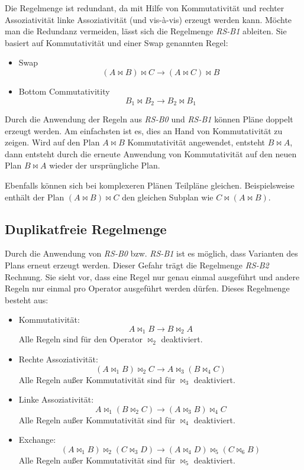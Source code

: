 Die Regelmenge ist redundant, da mit Hilfe von Kommutativität und rechter Assoziativität linke Assoziativität (und vis-à-vis) erzeugt werden kann. Möchte man die Redundanz vermeiden, lässt sich die Regelmenge \textit{RS-B1} ableiten. Sie basiert auf Kommutativität und einer Swap genannten Regel:

\begin{itemize}
\item Swap $$ (A \Join B) \Join C \to (A \Join C) \Join B $$
\item Bottom Commutativitity $$ B_1 \Join B_2 \to B_2 \Join B_1$$
\end{itemize}



Durch die Anwendung der Regeln aus \textit{RS-B0} und \textit{RS-B1} können Pläne doppelt erzeugt werden. Am einfachsten ist es, dies an Hand von Kommutativität zu zeigen. Wird auf den Plan $A \Join B$ Kommutativität angewendet, entsteht $B \Join A$, dann entsteht durch die erneute Anwendung von Kommutativität auf den neuen Plan $B \Join A$ wieder der ursprüngliche Plan.

Ebenfalls können sich bei komplexeren Plänen  Teilpläne gleichen. Beispielsweise enthält der Plan $(A \Join B) \Join C$ den gleichen Subplan wie $C \Join (A \Join B)$.



\subsection{Duplikatfreie Regelmenge}
Durch die Anwendung von \textit{RS-B0} bzw. \textit{RS-B1} ist es möglich, dass Varianten des Plans erneut erzeugt werden. Dieser Gefahr trägt die Regelmenge \textit{RS-B2} Rechnung. Sie sieht vor, dass eine Regel nur genau einmal ausgeführt und andere Regeln nur einmal pro Operator ausgeführt werden dürfen. Dieses Regelmenge besteht aus:


\begin{itemize}
\item Kommutativität: $$ A \Join_1 B \to B \Join_2 A$$
Alle Regeln sind für den Operator $\Join_2$ deaktiviert.
\item Rechte Assoziativität: $$(A \Join_1 B) \Join_2 C \to A \Join_3 (B \Join_4 C) $$
Alle Regeln außer Kommutativität sind für $\Join_3$ deaktiviert.
\item Linke Assoziativität: $$A \Join_1 (B \Join_2 C) \to (A \Join_3 B) \Join_4 C$$
Alle Regeln außer Kommutativität sind für $\Join_4$ deaktiviert.

\item Exchange: $$(A \Join_1 B) \Join_2 (C \Join_3 D) \to (A \Join_4 D) \Join_5 (C \Join_6 B) $$
Alle Regeln außer Kommutativität sind für $\Join_5$ deaktiviert.
\end{itemize}

